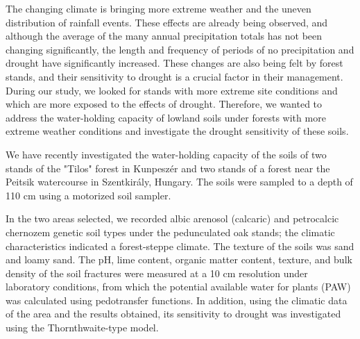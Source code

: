 



\newpage{}
{}
\begin{flushleft}





\end{flushleft}

\noindent

The changing climate is bringing more extreme weather and the uneven distribution of rainfall events. These effects are already being observed, and although the average of the many annual precipitation totals has not been changing significantly, the length and frequency of periods of no precipitation and drought have significantly increased. These changes are also being felt by forest stands, and their sensitivity to drought is a crucial factor in their management. During our study, we looked for stands with more extreme site conditions and which are more exposed to the effects of drought. Therefore, we wanted to address the water-holding capacity of lowland soils under forests with more extreme weather conditions and investigate the drought sensitivity of these soils.

We have recently investigated the water-holding capacity of the soils of two stands of the "Tilos" forest in Kunpeszér and two stands of a forest near the Peitsik watercourse in Szentkirály, Hungary. The soils were sampled to a depth of 110 cm using a motorized soil sampler.

In the two areas selected, we recorded albic arenosol (calcaric) and petrocalcic chernozem genetic soil types under the pedunculated oak stands; the climatic characteristics indicated a forest-steppe climate. The texture of the soils was sand and loamy sand. The pH, lime content, organic matter content, texture, and bulk density of the soil fractures were measured at a 10 cm resolution under laboratory conditions, from which the potential available water for plants (PAW) was calculated using pedotransfer functions. In addition, using the climatic data of the area and the results obtained, its sensitivity to drought was investigated using the Thornthwaite-type model.

